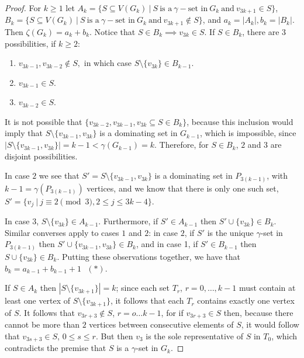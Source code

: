 \documentclass[twoside,12pt]{article}
\begin{document}
\begin{proof}
	For $k\ge 1$ let $A_k=\{S\subseteq V(G_k)\ |\ S \ \text{is a}\ \gamma-\text{set in}\ G_k \ \text{and} \ v_{3k+1} \in S\}$,
	 $B_k=\{S\subseteq V(G_k)\ |\ S \ \text{is a}\ \gamma-\text{set in}\ G_k \ \text{and} \ v_{3k+1} \notin S\}$, and $a_k=|A_k|, b_k=|B_k|$. Then $\zeta(G_k)=a_k+b_k$. Notice that $S\in B_k \implies v_{3k}\in S$. If $S\in B_k$, there are $3$ possibilities, if $k\ge 2$:
	 \begin{enumerate}
	     \item $ v_{3k-1}, v_{3k-2} \notin S,$ in which case $S\setminus \{v_{3k}\}\in B_{k-1}.$
	      \item $ v_{3k-1} \in S.$ 
	      \item $ v_{3k-2} \in S.$ 
	 \end{enumerate}
	 
	\indent It is not possible that $\{  v_{3k-2}, v_{3k-1},  v_{3k}\subseteq S \in B_k\}$, because this inclusion would imply that $S\setminus \{v_{3k-1},  v_{3k}\} $ is a dominating set in $G_{k-1}$, which is impossible, since $|S\setminus \{v_{3k-1},  v_{3k}\}|=k-1<\gamma(G_{k-1})=k$. Therefore, for $S\in B_k$, $2$ and $3$ are disjoint possibilities.
	
	\indent In case $2$ we see that $S'=S\setminus \{v_{3k-1},  v_{3k}\}$ is a dominating set in $P_{3(k-1)}$, with $k-1=\gamma(P_{3(k-1)})$ vertices, and we know that there is only one such set, $S'=\{v_j\ | \ j\equiv 2\pmod 3, 2\le j \le 3k-4\}$.
	
	\indent In case $3$, $S\setminus \{  v_{3k}\}\in A_{k-1}$. Furthermore, if $S' \in A_{k-1}$ then $S'\cup\{v_{3k}\} \in B_k$. Similar converses apply to cases $1$ and $2$: in case $2$, if $S'$ is the unique $\gamma$-set in $P_{3(k-1)}$ then $S'\cup \{v_{3k-1},  v_{3k}\} \in B_k$, and in case 1, if $S' \in B_{k-1}$ then $S\cup \{v_{3k}\} \in B_k$. Putting these observations together, we have that $b_k=a_{k-1}+b_{k-1}+1 \ \ \ (*)$.%
	
	\indent If $S\in A_k$ then $|S\setminus \{v_{3k+1}\}|=k$; since each set $T_r$, $r=0, \ldots, k-1$ must contain at least one vertex of $S\setminus \{v_{3k+1}\}$, it follows that each $T_r$ contains exactly one vertex of $S$. It follows that $v_{3r+3}\notin S$, $r=o\ldots k-1$, for if $v_{3r+3}\in S$ then, because there cannot be more than $2$ vertices between consecutive elements of $S$, it would follow that $v_{3s+3}\in S$, $0\le s \le r$. But then $v_3$ is the sole representative of $S$ in $T_0$, which contradicts the premise that $S$ is a $\gamma$-set in $G_k$. 
	

\end{proof}
\end{document}

